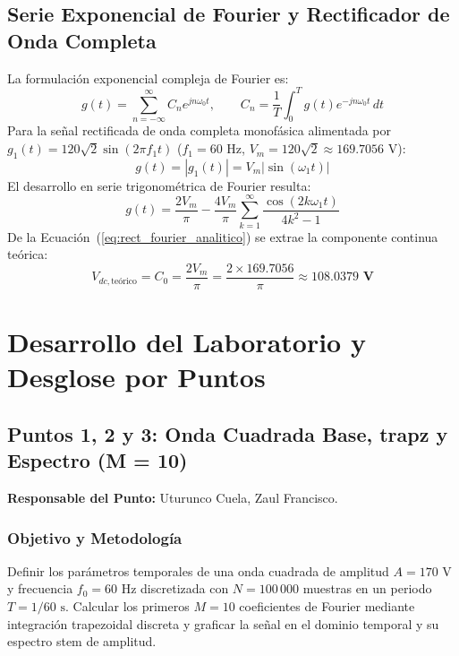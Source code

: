 \documentclass[11pt,a4paper]{article}
\begin{document}
\subsection{Serie Exponencial de Fourier y Rectificador de Onda Completa}
La formulación exponencial compleja de Fourier es:
\begin{equation}
    g(t) = \sum_{n=-\infty}^\infty C_n e^{j n \omega_0 t}, \qquad C_n = \frac{1}{T} \int_0^T g(t) e^{-j n \omega_0 t}\, dt
\end{equation}
Para la señal rectificada de onda completa monofásica alimentada por $g_1(t) = 120\sqrt{2}\sin(2\pi f_1 t)$ ($f_1 = 60\text{ Hz}$, $V_m = 120\sqrt{2} \approx 169.7056\text{ V}$):
\begin{equation}
    g(t) = |g_1(t)| = V_m |\sin(\omega_1 t)|
\end{equation}
El desarrollo en serie trigonométrica de Fourier resulta:
\begin{equation}
    g(t) = \frac{2V_m}{\pi} - \frac{4V_m}{\pi} \sum_{k=1}^\infty \frac{\cos(2k\omega_1 t)}{4k^2 - 1}
    \label{eq:rect_fourier_analitico}
\end{equation}
De la Ecuación~(\ref{eq:rect_fourier_analitico}) se extrae la componente continua teórica:
\begin{equation}
    V_{dc,\text{teórico}} = C_0 = \frac{2V_m}{\pi} = \frac{2 \times 169.7056}{\pi} \approx \mathbf{108.0379\text{ V}}
    \label{eq:vdc_teorico}
\end{equation}

\section{Desarrollo del Laboratorio y Desglose por Puntos}

\subsection{Puntos 1, 2 y 3: Onda Cuadrada Base, trapz y Espectro (M = 10)}
\textbf{Responsable del Punto:} Uturunco Cuela, Zaul Francisco.

\subsubsection{Objetivo y Metodología}
Definir los parámetros temporales de una onda cuadrada de amplitud $A = 170\text{ V}$ y frecuencia $f_0 = 60\text{ Hz}$ discretizada con $N = 100\,000$ muestras en un periodo $T = 1/60\text{ s}$. Calcular los primeros $M = 10$ coeficientes de Fourier mediante integración trapezoidal discreta y graficar la señal en el dominio temporal y su espectro stem de amplitud.
\end{document}
